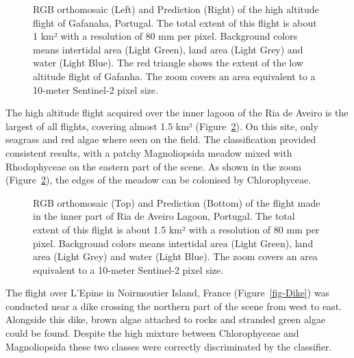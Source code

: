\documentclass[
  number]{elsarticle}
\begin{document}
\label{cell-fig-GafHigh}
\begin{figure}[H]


\caption{\label{fig-GafHigh}RGB orthomosaic (Left) and Prediction
(Right) of the high altitude flight of Gafanaha, Portugal. The total
extent of this flight is about 1 km² with a resolution of 80 mm per
pixel. Background colors means intertidal area (Light Green), land area
(Light Grey) and water (Light Blue). The red triangle shows the extent
of the low altitude flight of Gafanha. The zoom covers an area
equivalent to a 10-meter Sentinel-2 pixel size.}

\end{figure}%

The high altitude flight acquired over the inner lagoon of the Ria de
Aveiro is the largest of all flights, covering almost 1.5 km²
(Figure~\ref{fig-Boat}). On this site, only seagrass and red algae where
seen on the field. The classification provided consistent results, with
a patchy Magnoliopsida meadow mixed with Rhodophyceae on the eastern
part of the scene. As shown in the zoom (Figure~\ref{fig-Boat}), the
edges of the meadow can be colonised by Chlorophyceae.

\label{cell-fig-Boat}
\begin{figure}[H]


\caption{\label{fig-Boat}RGB orthomosaic (Top) and Prediction (Bottom)
of the flight made in the inner part of Ria de Aveiro Lagoon, Portugal.
The total extent of this flight is about 1.5 km² with a resolution of 80
mm per pixel. Background colors means intertidal area (Light Green),
land area (Light Grey) and water (Light Blue). The zoom covers an area
equivalent to a 10-meter Sentinel-2 pixel size.}

\end{figure}%

The flight over L'Epine in Noirmoutier Island, France
(Figure~\ref{fig-Dike}) was conducted near a dike crossing the northern
part of the scene from west to east. Alongside this dike, brown algae
attached to rocks and stranded green algae could be found. Despite the
high mixture between Chlorophyceae and Magnoliopsida these two classes
were correctly discriminated by the classifier.
\end{document}
